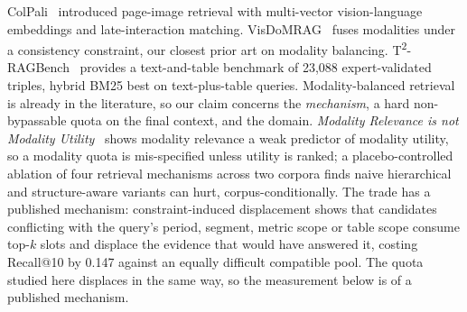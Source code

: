 \documentclass[conference]{IEEEtran}
\begin{document}
ColPali~\cite{faysse2025colpali} introduced page-image retrieval with
multi-vector vision-language embeddings and late-interaction matching.
VisDoMRAG~\cite{suri2024visdom} fuses modalities under a consistency
constraint, our closest prior art on modality balancing.
T\textsuperscript{2}-RAGBench~\cite{strich2026t2} provides a text-and-table
benchmark of 23{,}088 expert-validated triples, hybrid BM25 best on
text-plus-table queries. Modality-balanced retrieval is already in the
literature, so our claim concerns the \emph{mechanism}, a hard non-bypassable
quota on the final context, and the domain. \emph{Modality Relevance is not
Modality Utility}~\cite{chen2026modalityutility} shows modality relevance a
weak predictor of modality utility, so a modality quota is mis-specified unless
utility is ranked; a placebo-controlled ablation of four retrieval mechanisms
across two corpora \cite{sharma2026placebo} finds naive hierarchical and
structure-aware variants can hurt, corpus-conditionally. The trade has a
published mechanism: constraint-induced displacement shows
that candidates conflicting with the query's period, segment, metric scope or
table scope consume top-$k$ slots and displace the evidence that would have
answered it, costing Recall@10 by 0.147 against an equally difficult
compatible pool. The quota studied here displaces in the same way, so the
measurement below is of a published mechanism.
\end{document}
